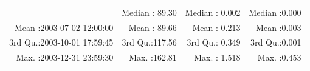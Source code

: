 \documentclass[
  10pt,
  a4paper,oneside]{article}
\begin{document}
\begin{longtable}[]{@{}rrrr@{}}
\begin{minipage}[t]{0.33\columnwidth}
\end{minipage} & \begin{minipage}[t]{0.19\columnwidth}\raggedleft
Median : 89.30\strut
\end{minipage} & \begin{minipage}[t]{0.19\columnwidth}\raggedleft
Median : 0.002\strut
\end{minipage} & \begin{minipage}[t]{0.19\columnwidth}\raggedleft
Median :0.000\strut
\end{minipage}\tabularnewline
\begin{minipage}[t]{0.33\columnwidth}\raggedleft
Mean :2003-07-02 12:00:00\strut
\end{minipage} & \begin{minipage}[t]{0.19\columnwidth}\raggedleft
Mean : 89.66\strut
\end{minipage} & \begin{minipage}[t]{0.19\columnwidth}\raggedleft
Mean : 0.213\strut
\end{minipage} & \begin{minipage}[t]{0.19\columnwidth}\raggedleft
Mean :0.003\strut
\end{minipage}\tabularnewline
\begin{minipage}[t]{0.33\columnwidth}\raggedleft
3rd Qu.:2003-10-01 17:59:45\strut
\end{minipage} & \begin{minipage}[t]{0.19\columnwidth}\raggedleft
3rd Qu.:117.56\strut
\end{minipage} & \begin{minipage}[t]{0.19\columnwidth}\raggedleft
3rd Qu.: 0.349\strut
\end{minipage} & \begin{minipage}[t]{0.19\columnwidth}\raggedleft
3rd Qu.:0.001\strut
\end{minipage}\tabularnewline
\begin{minipage}[t]{0.33\columnwidth}\raggedleft
Max. :2003-12-31 23:59:30\strut
\end{minipage} & \begin{minipage}[t]{0.19\columnwidth}\raggedleft
Max. :162.81\strut
\end{minipage} & \begin{minipage}[t]{0.19\columnwidth}\raggedleft
Max. : 1.518\strut
\end{minipage} & \begin{minipage}[t]{0.19\columnwidth}\raggedleft
Max. :0.453\strut
\end{minipage}\tabularnewline

\end{longtable}
\end{document}
